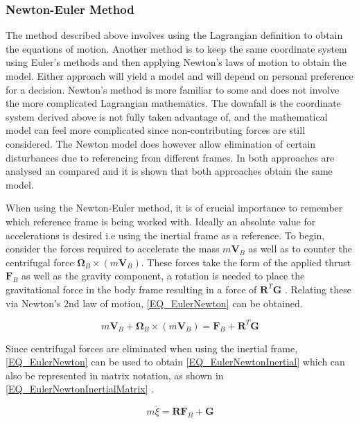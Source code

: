 \subsubsection{Newton-Euler Method}
The method described above involves using the Lagrangian definition to obtain the equations of motion. Another method is to keep the same coordinate system using Euler's methods and then applying Newton's laws of motion to obtain the model. Either approach will yield a model and will depend on personal preference for a decision. Newton's method is more familiar to some and does not involve the more complicated Lagrangian mathematics. The downfall is the coordinate system derived above is not fully taken advantage of, and the mathematical model can feel more complicated since non-contributing forces are still considered. The Newton model does however allow elimination of certain disturbances due to referencing from different frames. 
In \cite{Luukkonen, Modelling} both approaches are analysed an compared and it is shown that both approaches obtain the same model.

When using the Newton-Euler method, it is of crucial importance to remember which reference frame is being worked with. Ideally an absolute value for accelerations is desired i.e using the inertial frame as a reference. To begin, consider the forces required to accelerate the mass $m\textbf{V}_B$ as well as to counter the centrifugal force $\boldsymbol{\Omega}_B \times (m\textbf{V}_B)$. These forces take the form of the applied thrust $\textbf{F}_B$ as well as the gravity component, a rotation is needed to place the gravitational force in the body frame resulting in a force of $\textbf{R}^T \textbf{G}$ \cite{Luukkonen}. Relating these via Newton's 2nd law of motion, \eqref{EQ_EulerNewton} can be obtained.

\begin{equation}
m\textbf{V}_B + \boldsymbol{\Omega}_B \times (m\textbf{V}_B) = \textbf{F}_B + \textbf{R}^T \textbf{G}
\label{EQ_EulerNewton}
\end{equation}

Since centrifugal forces are eliminated when using the inertial frame, \eqref{EQ_EulerNewton} can be used to obtain  \eqref{EQ_EulerNewtonInertial} which can also be represented in matrix notation, as shown in \eqref{EQ_EulerNewtonInertialMatrix} \cite{Luukkonen}. 

\begin{equation}
m\ddot{\xi}  = \textbf{R}\textbf{F}_B + \textbf{G}
\label{EQ_EulerNewtonInertial}
\end{equation}

